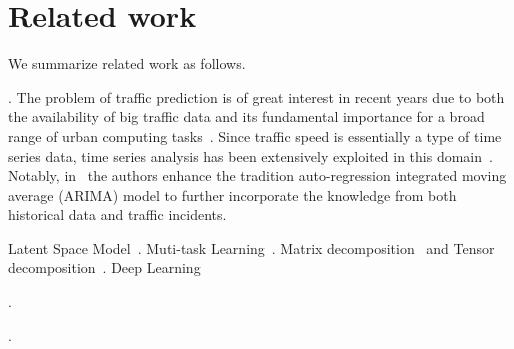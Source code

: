 \section{Related work}
\label{sec-related}

We summarize related work as follows.

. The problem of traffic prediction is of great interest in recent years due to both the availability of big traffic data and its fundamental importance for a broad range of urban computing tasks~\cite{Zheng2014TIST}.
%
Since traffic speed is essentially a type of time series data, time series analysis has been extensively exploited in this domain~\cite{traffic2011TRP,TS2012ICDM}. Notably, in~\cite{TS2012ICDM} the authors enhance the tradition auto-regression integrated moving average (ARIMA) model to further incorporate the knowledge from both historical data and traffic incidents.


Latent Space Model~\cite{LSM2016KDD}.
Muti-task Learning~\cite{MTL2017ICDM}.
Matrix decomposition~\cite{Zhu2013TMC,Shang2014KDD} and Tensor decomposition~\cite{Wang2014KDD}.
Deep Learning~\cite{DL2016ICDM,DL2017SDM,DL2017CoRR}


.

. 






